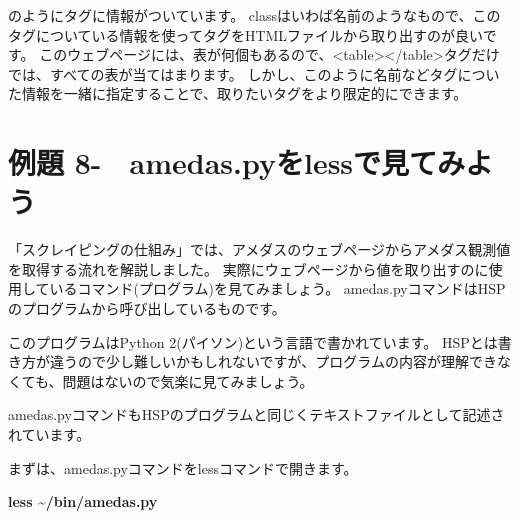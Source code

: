 \documentclass[a4paper,12pt,dvipdfmx]{jarticle}
\newcounter{Exercise}
\renewcommand\theExercise{例題 8-\arabic{Exercise}}
\begin{document}
のようにタグに情報がついています。
classはいわば名前のようなもので、このタグについている情報を使ってタグをHTMLファイルから取り出すのが良いです。
このウェブページには、表が何個もあるので、{\textless}table{\textgreater}{\textless}/table{\textgreater}タグだけでは、すべての表が当てはまります。
しかし、このように名前などタグについた情報を一緒に指定することで、取りたいタグをより限定的にできます。


\bigskip


\bigskip
{}
\clearpage\section{\theExercise　amedas.pyをlessで見てみよう}
「スクレイピングの仕組み」では、アメダスのウェブページからアメダス観測値を取得する流れを解説しました。
実際にウェブページから値を取り出すのに使用しているコマンド(プログラム)を見てみましょう。
amedas.pyコマンドはHSPのプログラムから呼び出しているものです。

このプログラムはPython
2(パイソン)という言語で書かれています。
HSPとは書き方が違うので少し難しいかもしれないですが、プログラムの内容が理解できなくても、問題はないので気楽に見てみましょう。


\bigskip

amedas.pyコマンドもHSPのプログラムと同じくテキストファイルとして記述されています。

まずは、amedas.pyコマンドをlessコマンドで開きます。


\bigskip

\textbf{less \~{}/bin/amedas.py}
\end{document}

